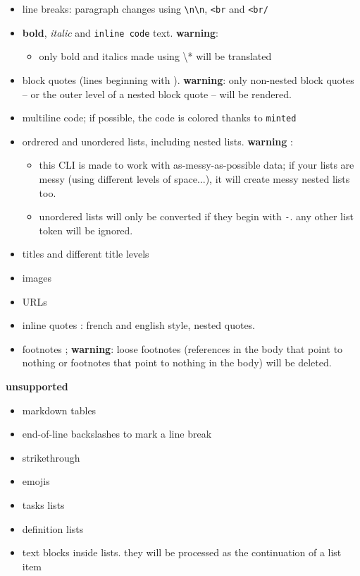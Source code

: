 \begin{itemize}
\item line breaks: paragraph changes using \texttt{\textbackslash{}n\textbackslash{}n}, \texttt{<br} and \texttt{<br/}
\item \textbf{bold}, \textit{italic} and \texttt{inline code} text. \textbf{warning}:
\begin{itemize} 
 \item only bold and italics made using \textbackslash{}* will be translated
\end{itemize}
\item block quotes (lines beginning with \texttt{}). \textbf{warning}: only non-nested block quotes -- or the outer level of a nested block quote -- will be rendered.
\item multiline code; if possible, the code is colored thanks to \texttt{minted}
\item ordrered and unordered lists, including nested lists. \textbf{warning} : 
\begin{itemize} 
 \item this CLI is made to work with as-messy-as-possible data; if your lists are messy (using different levels of space...), it will create messy nested lists too.
\item unordered lists will only be converted if they begin with \texttt{-}. any other list token will be ignored.
\end{itemize}
\item titles and different title levels
\item images
\item URLs
\item inline quotes : french and english style, nested quotes.
\item footnotes ; \textbf{warning}: loose footnotes (references in the body that point to nothing or footnotes that point to nothing in the body) will be deleted. 
\end{itemize}

\textbf{unsupported}

\begin{itemize}
\item markdown tables
\item end-of-line backslashes to mark a line break
\item strikethrough
\item emojis
\item tasks lists
\item definition lists
\item text blocks inside lists. they will be processed as the continuation of a list item 
\end{itemize}

